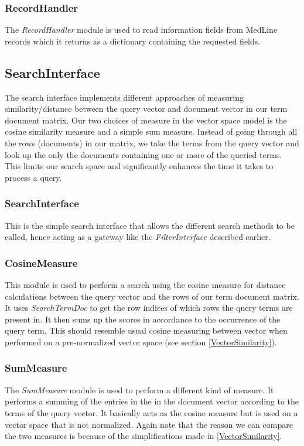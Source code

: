 \subsubsection{RecordHandler}
The \textit{RecordHandler} module is used to read information fields
from MedLine records which it returns as a dictionary containing the
requested fields.

\subsection{SearchInterface}
The search interface implements different approaches of measuring
similarity/distance between the query vector and document vector in
our term document matrix. Our two choices of measure in the vector
space model is the cosine similarity measure and a simple sum
measure. Instead of going through all the rows (documents) in our
matrix, we take the terms from the query vector and look up the only
the documents containing one or more of the queried terms. This limits
our search space and significantly enhances the time it takes to
process a query.

\subsubsection{SearchInterface}
This is the simple search interface that allows the different search
methods to be called, hence acting as a gateway like the
\textit{FilterInterface} described earlier.

\subsubsection{CosineMeasure}
This module is used to perform a search using the cosine measure for
distance calculations between the query vector and the rows of our
term document matrix. It uses \textit{SearchTermDoc} to get the row
indices of which rows the query terms are present in. It then sums up
the scores in accordance to the occurrence of the query term. This
should resemble usual cosine measuring between vector when performed
on a pre-normalized vector space (see section \ref{VectorSimilarity}).

\subsubsection{SumMeasure}
The \textit{SumMeasure} module is used to perform a different kind of
measure. It performs a summing of the entries in the in the document
vector according to the terms of the query vector. It basically acts
as the cosine measure but is used on a vector space that is not
normalized. Again note that the reason we can compare the two measures
is because of the simplifications made in \ref{VectorSimilarity}.

